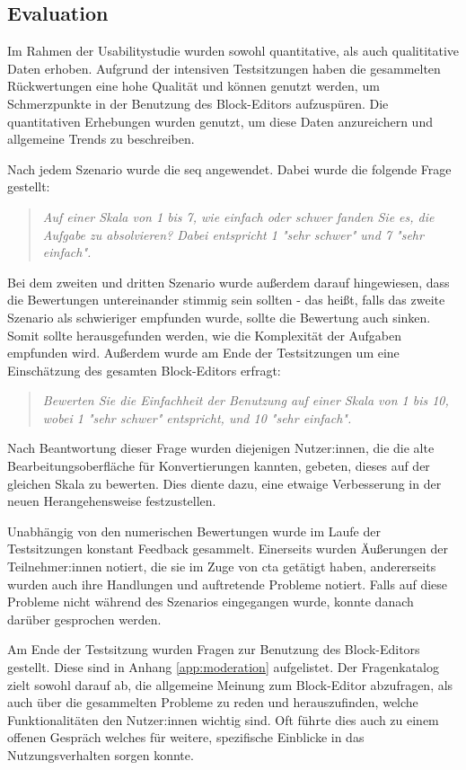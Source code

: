 \subsection{Evaluation}
Im Rahmen der Usabilitystudie wurden sowohl quantitative, als auch qualititative Daten erhoben. Aufgrund der intensiven Testsitzungen haben die gesammelten Rückwertungen eine hohe Qualität und können genutzt werden, um Schmerzpunkte in der Benutzung des Block-Editors aufzuspüren. Die quantitativen Erhebungen wurden genutzt, um diese Daten anzureichern und allgemeine Trends zu beschreiben.

Nach jedem Szenario wurde die \acf{seq} angewendet. Dabei wurde die folgende Frage gestellt:
\begin{quote}
  \textit{
  Auf einer Skala von 1 bis 7, wie einfach oder schwer fanden Sie es, die Aufgabe zu absolvieren? Dabei entspricht 1 "sehr schwer" und 7 "sehr einfach".}
\end{quote}
Bei dem zweiten und dritten Szenario wurde außerdem darauf hingewiesen, dass die Bewertungen untereinander stimmig sein sollten - das heißt, falls das zweite Szenario als schwieriger empfunden wurde, sollte die Bewertung auch sinken. Somit sollte herausgefunden werden, wie die Komplexität der Aufgaben empfunden wird. Außerdem wurde am Ende der Testsitzungen um eine Einschätzung des gesamten Block-Editors erfragt:
\begin{quote}
  \textit{
    Bewerten Sie die Einfachheit der Benutzung auf einer Skala von 1 bis 10, wobei 1 "sehr schwer" entspricht, und 10 "sehr einfach".
  }
\end{quote}
Nach Beantwortung dieser Frage wurden diejenigen Nutzer:innen, die die alte Bearbeitungsoberfläche für Konvertierungen kannten, gebeten, dieses auf der gleichen Skala zu bewerten. Dies diente dazu, eine etwaige Verbesserung in der neuen Herangehensweise festzustellen.

Unabhängig von den numerischen Bewertungen wurde im Laufe der Testsitzungen konstant Feedback gesammelt. Einerseits wurden Äußerungen der Teilnehmer:innen notiert, die sie im Zuge von \ac{cta} getätigt haben, andererseits wurden auch ihre Handlungen und auftretende Probleme notiert. Falls auf diese Probleme nicht während des Szenarios eingegangen wurde, konnte danach darüber gesprochen werden.

Am Ende der Testsitzung wurden Fragen zur Benutzung des Block-Editors gestellt. Diese sind in Anhang \ref{app:moderation} aufgelistet. Der Fragenkatalog zielt sowohl darauf ab, die allgemeine Meinung zum Block-Editor abzufragen, als auch über die gesammelten Probleme zu reden und herauszufinden, welche Funktionalitäten den Nutzer:innen wichtig sind. Oft führte dies auch zu einem offenen Gespräch welches für weitere, spezifische Einblicke in das Nutzungsverhalten sorgen konnte.
